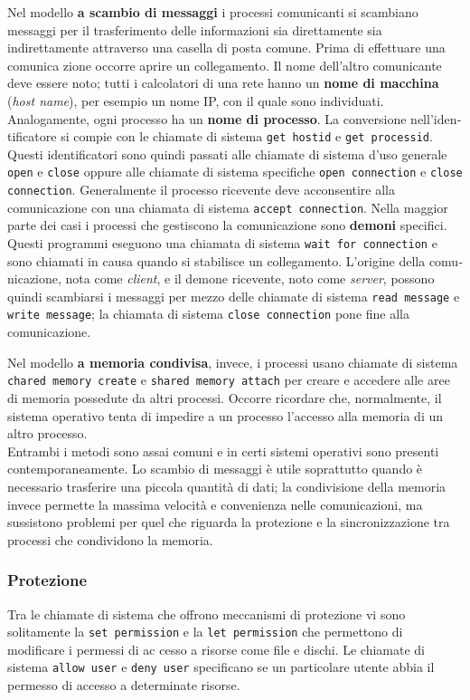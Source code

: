 \documentclass[11pt,a4paper]{article}
\begin{document}
Nel modello \textbf{a scambio di messaggi} i processi co­municanti si scambiano messaggi per il trasferimento delle informazioni sia direttamente sia
indirettamente attraverso una casella di posta comune. Prima di effettuare una comunica­
zione occorre aprire un collegamento. Il nome dell'altro comunicante deve essere noto;
tutti i calcolatori di una rete hanno
un \textbf{nome di macchina} (\emph{host name}), per esempio un nome IP, con il quale sono individuati.
Analogamente, ogni processo ha un \textbf{nome di processo}.
La conversione nell'iden­tificatore si compie con le chiamate di sistema \texttt{get hostid} e \texttt{get processid}. Questi identificatori sono quindi passati alle chiamate di sistema d'uso generale \texttt{open} e \texttt{close} oppure
alle chiamate di sistema specifiche \texttt{open connection} e \texttt{close connection}. Gene­ralmente il processo ricevente deve acconsentire alla comunicazione con una chiamata di si­stema \texttt{accept connection}. Nella maggior parte dei casi i processi che gestiscono la co­municazione sono \textbf{demoni} specifici.
Questi programmi eseguono una chiamata di sistema \texttt{wait for connection} e sono chiamati in causa quando si stabilisce un collegamento. L'origine della comu­nicazione, nota come \emph{client}, e il demone ricevente, noto come \emph{server}, possono quindi scam­biarsi i messaggi per mezzo delle chiamate di sistema \texttt{read message} e \texttt{write message}; la
chiamata di sistema \texttt{close connection} pone fine alla comunicazione.

Nel modello \textbf{a memoria condivisa}, invece, i processi usano chiamate di sistema \texttt{chared memory create} e \texttt{shared memory attach} per creare e accedere alle aree di me­moria possedute da altri processi. Occorre ricordare che, normalmente, il sistema operativo
tenta di impedire a un processo l'accesso alla memoria di un altro processo.\\

Entrambi i metodi sono assai comuni e in certi sistemi operativi sono presenti con­temporaneamente. Lo scambio di messaggi è utile soprattutto quando è necessario trasferi­re una piccola quantità di dati;
la condivisione della memoria invece permette la massima ve­locità e convenienza nelle comunicazioni, ma sussistono proble­mi per quel che riguarda la protezione e la sincronizzazione tra processi che condividono la memoria.

\subsubsection{Protezione}
Tra le chiamate di sistema che offrono meccanismi di protezione vi sono solitamente la
\texttt{set permission} e la \texttt{let permission} che permettono di modificare i permessi di ac­
cesso a risorse come file e dischi. Le chiamate di sistema \texttt{allow user} e \texttt{deny user} speci­ficano se un particolare utente abbia il permesso di accesso a determinate risorse.
\end{document}
